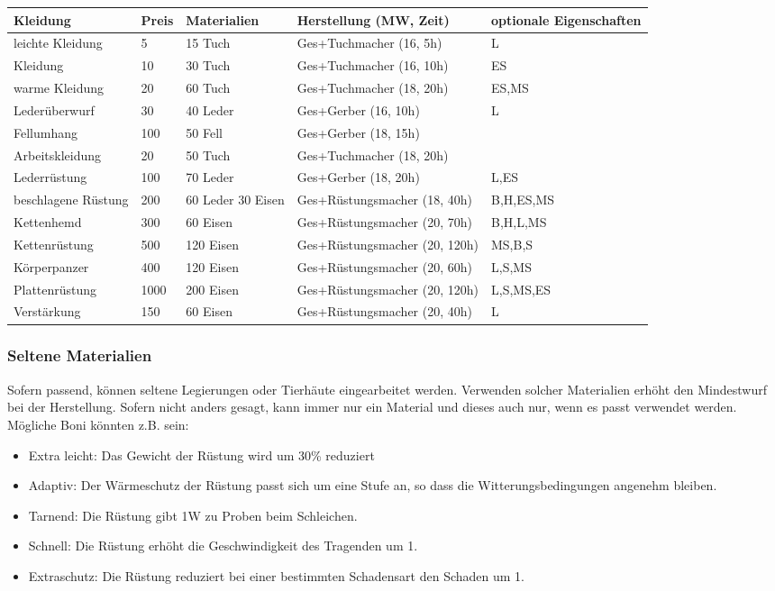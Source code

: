 \documentclass{article}
\begin{document}
\begin{small}
\begin{tabular}{|m{25mm}|m{1cm}|m{3cm}|m{5cm}|m{30mm}|}
\hline
\textbf{Kleidung}&\textbf{Preis}&\textbf{Materialien}&\textbf{Herstellung (MW, Zeit)}&\textbf{optionale Eigenschaften}\\
\hline
\hline
leichte Kleidung&5&15 Tuch&Ges+Tuchmacher (16, 5h)&L\\
\hline
Kleidung&10&30 Tuch&Ges+Tuchmacher (16, 10h)&ES\\
\hline
warme Kleidung&20&60 Tuch&Ges+Tuchmacher (18, 20h)&ES,MS\\
\hline
Lederüberwurf&30&40 Leder&Ges+Gerber (16, 10h)&L\\
\hline
Fellumhang&100&50 Fell&Ges+Gerber (18, 15h)&\\
\hline
Arbeitskleidung&20&50 Tuch&Ges+Tuchmacher (18, 20h)&\\
\hline
Lederrüstung&100&70 Leder&Ges+Gerber (18, 20h)&L,ES\\
\hline
beschlagene Rüstung&200&60 Leder 30 Eisen&Ges+Rüstungsmacher (18, 40h)&B,H,ES,MS\\
\hline
Kettenhemd&300&60 Eisen&Ges+Rüstungsmacher (20, 70h)&B,H,L,MS\\
\hline
Kettenrüstung&500&120 Eisen&Ges+Rüstungsmacher (20, 120h)&MS,B,S\\
\hline
Körperpanzer&400&120 Eisen&Ges+Rüstungsmacher (20, 60h)&L,S,MS\\
\hline
Plattenrüstung&1000&200 Eisen&Ges+Rüstungsmacher (20, 120h)&L,S,MS,ES\\
\hline
Verstärkung&150&60 Eisen&Ges+Rüstungsmacher (20, 40h)&L\\
\hline
\end{tabular}
\end{small}

\subsubsection{Seltene Materialien}

Sofern passend, können seltene Legierungen oder Tierhäute eingearbeitet werden. Verwenden solcher Materialien erhöht
den Mindestwurf bei der Herstellung. Sofern nicht anders gesagt, kann immer nur ein Material und dieses auch nur,
wenn es passt verwendet werden. Mögliche Boni könnten z.B. sein:

\begin{itemize}
\item Extra leicht: Das Gewicht der Rüstung wird um 30\% reduziert
\item Adaptiv: Der Wärmeschutz der Rüstung passt sich um eine Stufe an, so dass die Witterungsbedingungen angenehm bleiben.
\item Tarnend: Die Rüstung gibt 1W zu Proben beim Schleichen.
\item Schnell: Die Rüstung erhöht die Geschwindigkeit des Tragenden um 1.
\item Extraschutz: Die Rüstung reduziert bei einer bestimmten Schadensart den Schaden um 1.
\end{itemize}
\end{document}
